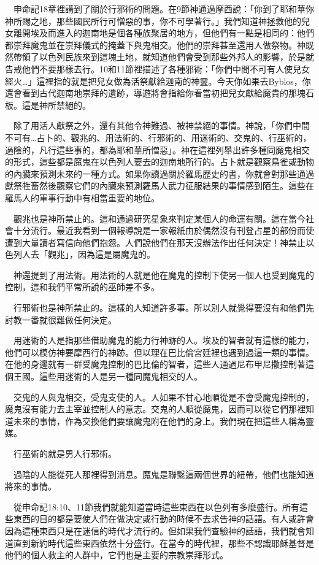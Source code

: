 \documentclass{book}
\begin{document}
　申命記18章裡講到了關於行邪術的問題。在9節神通過摩西說：「你到了耶和華你神所賜之地，那些國民所行可憎惡的事，你不可學著行。」我們知道神拯救他的兒女離開埃及而進入的迦南地是個各種族聚居的地方，但他們有一點是相同的：他們都崇拜魔鬼並在崇拜儀式的掩蓋下與鬼相交。他們的崇拜甚至還用人做祭物。神既然帶領了以色列民族來到這塊土地，就知道他們會受到那些外邦人的影響，於是就告戒他們不要那樣去行。10和11節裡描述了各種邪術：「你們中間不可有人使兒女經火…」這裡指的就是把兒女做為活祭獻給迦南的神靈。今天你如果去Byblos，你還會看到古代迦南地崇拜的遺跡，導遊將會指給你看當初把兒女獻給魔貴的那塊石板。這是神所禁絕的。

　除了用活人獻祭之外，還有其他令神難過、被神禁絕的事情。神說，「你們中間不可有…占卜的、觀兆的、用法術的、行邪術的、用迷術的、交鬼的、行巫術的，過陰的，凡行這些事的，都為耶和華所憎惡」。神在這裡列舉出許多種同魔鬼相交的形式，這些都是魔鬼在以色列人要去的迦南地所行的。占卜就是觀察鳥雀或動物的內臟來預測未來的一種方式。如果你讀過關於羅馬歷史的書，你就會對那些通過獻祭牲畜然後觀察它們的內臟來預測羅馬人武力征服結果的事情感到陌生。這些在羅馬人的軍事行動中有相當重要的地位。

　觀兆也是神所禁止的。這和通過研究星象來判定某個人的命運有關。這在當今社會十分流行。最近我看到一個報導說是一家報紙由於偶然沒有刊登占星的部份而使遭到大量讀者寫信向他們抱怨。人們說他們在那天沒辦法作出任何決定！神禁止以色列人去「觀兆」，因為這是屬魔鬼的。

　神還提到了用法術。用法術的人就是他在魔鬼的控制下使另一個人也受到魔鬼的控制，這和我們平常所說的巫師差不多。

　行邪術也是神所禁止的。這樣的人知道許多事。所以別人就覺得要沒有和他們先討教一番就很難做任何決定。

　用迷術的人是指那些借助魔鬼的能力行神跡的人。埃及的智者就有這樣的能力，他們可以模仿神要摩西行的神跡。但以理在巴比倫宮廷裡也遇到過這一類的事情。在他的身邊就有一群受魔鬼控制的巴比倫的智者，這些人通過尼布甲尼撒控制著這個王國。這些用迷術的人是另一種同魔鬼相交的人。

　交鬼的人與鬼相交，受鬼支使的人。人如果不甘心地順從是不會受魔鬼控制的，魔鬼沒有能力去主宰並控制人的意志。交鬼的人順從魔鬼，因而可以從它們那裡知道未來的事情，作為交換他們要讓魔鬼附在他們的身上。我們現在把這些人稱為靈媒。

　行巫術的就是男人行邪術。

　過陰的人能從死人那裡得到消息。魔鬼是聯繫這兩個世界的紐帶，他們也能知道將來的事情。

　從申命記18:10、11節我們就能知道當時這些東西在以色列有多麼盛行。所有這些東西的目的都是要使人們在做決定或行動的時候不去求告神的話語。有人或許會因為這種東西只是在迷信的時代才流行的。但如果我們查驗神的話語，我們就會知道直到新約時代這些東西依然十分盛行。在當今的時代裡，那些不認識耶穌基督是他們的個人救主的人群中，它們也是主要的宗教崇拜形式。
\end{document}

